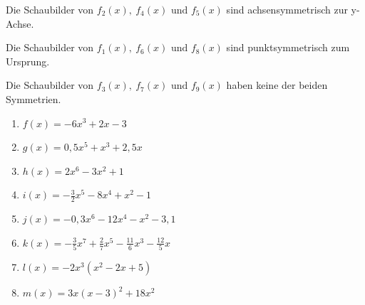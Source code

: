 \textcolor{loes}{Die Schaubilder von \(f_2(x),\ f_4(x)\text{ und } f_5(x)\) sind achsensymmetrisch zur y-Achse.}

\textcolor{loes}{Die Schaubilder von \(f_1(x),\ f_6(x)\text{ und } f_8(x)\) sind punktsymmetrisch zum Ursprung.}

\textcolor{loes}{Die Schaubilder von \(f_3(x),\ f_7(x)\text{ und } f_9(x)\) haben keine der beiden Symmetrien.}
\newpage
\begin{Exercise}[title={Untersuche auf Symmetrie}, label=ganzSymA1]

	\begin{minipage}{\textwidth}
		\begin{minipage}{0.5\textwidth}
			\begin{enumerate}[label=\alph*)]
				\item \(f(x)=-6x^3+2x-3\)
				\item \(g(x)=0,5x^5+x^3+2,5x\)
				\item \(h(x)=2x^6-3x^2+1\)
				\item \(i(x)=-\frac{3}{2}x^5-8x^4+x^2-1\)
			\end{enumerate}
		\end{minipage}%
		\begin{minipage}{0.5\textwidth}
			\begin{enumerate}[label=\alph*)]
				\setcounter{enumi}{4}
				\item \(j(x)=-0,3x^6-12x^4-x^2-3,1\)
				\item \(k(x)=-\frac{3}{5}x^7+\frac{2}{7}x^5-\frac{11}{6}x^3-\frac{12}{5}x\)
				\item \(l(x)=-2x^3\left(x^2-2x+5\right)\)
				\item \(m(x)=3x\left(x-3\right)^2+18x^2\)
			\end{enumerate}
		\end{minipage}%
	\end{minipage}
\end{Exercise}
\newpage
